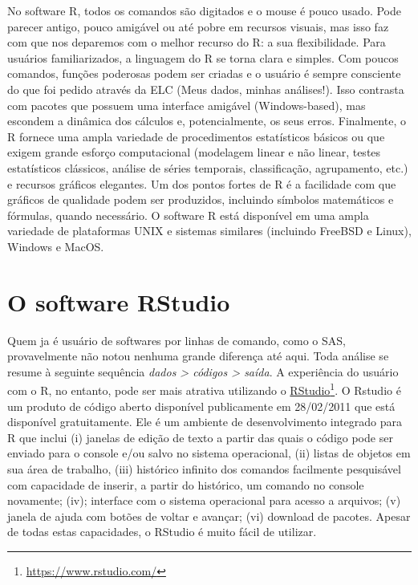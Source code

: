 \documentclass[
]{book}
\numberwithin{equation}{section}
\begin{document}
No software R, todos os comandos são digitados e o mouse é pouco usado. Pode parecer antigo, pouco amigável ou até pobre em recursos visuais, mas isso faz com que nos deparemos com o melhor recurso do R: a sua flexibilidade. Para usuários familiarizados, a linguagem do R se torna clara e simples. Com poucos comandos, funções poderosas podem ser criadas e o usuário é sempre consciente do que foi pedido através da ELC (Meus dados, minhas análises!). Isso contrasta com pacotes que possuem uma interface amigável (Windows-based), mas escondem a dinâmica dos cálculos e, potencialmente, os seus erros. Finalmente, o R fornece uma ampla variedade de procedimentos estatísticos básicos ou que exigem grande esforço computacional (modelagem linear e não linear, testes estatísticos clássicos, análise de séries temporais, classificação, agrupamento, etc.) e recursos gráficos elegantes. Um dos pontos fortes de R é a facilidade com que gráficos de qualidade podem ser produzidos, incluindo símbolos matemáticos e fórmulas, quando necessário. O software R está disponível em uma ampla variedade de plataformas UNIX e sistemas similares (incluindo FreeBSD e Linux), Windows e MacOS.

\hypertarget{o-software-rstudio}{%
\section{O software RStudio}\label{o-software-rstudio}}

Quem ja é usuário de softwares por linhas de comando, como o SAS, provavelmente não notou nenhuma grande diferença até aqui. Toda análise se resume à seguinte sequência \emph{dados \textgreater{} códigos \textgreater{} saída}. A experiência do usuário com o R, no entanto, pode ser mais atrativa utilizando o \href{https://www.rstudio.com/}{RStudio}\footnote{\url{https://www.rstudio.com/}}. O Rstudio é um produto de código aberto disponível publicamente em 28/02/2011 que está disponível gratuitamente. Ele é um ambiente de desenvolvimento integrado para R que inclui (i) janelas de edição de texto a partir das quais o código pode ser enviado para o console e/ou salvo no sistema operacional, (ii) listas de objetos em sua área de trabalho, (iii) histórico infinito dos comandos facilmente pesquisável com capacidade de inserir, a partir do histórico, um comando no console novamente; (iv); interface com o sistema operacional para acesso a arquivos; (v) janela de ajuda com botões de voltar e avançar; (vi) download de pacotes. Apesar de todas estas capacidades, o RStudio é muito fácil de utilizar.
\end{document}
